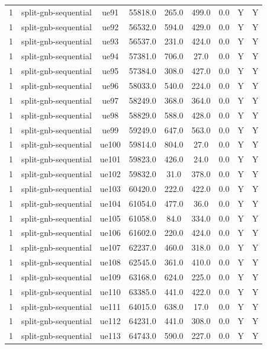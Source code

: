 \begin{table}[ht]
\begin{tabular}{|c|c|c|c|c|c|c|c|c|}
1 & split-gnb-sequential & ue91 & 55818.0 & 265.0 & 499.0 & 0.0 & Y & Y \\
1 & split-gnb-sequential & ue92 & 56532.0 & 594.0 & 429.0 & 0.0 & Y & Y \\
1 & split-gnb-sequential & ue93 & 56537.0 & 231.0 & 424.0 & 0.0 & Y & Y \\
1 & split-gnb-sequential & ue94 & 57381.0 & 706.0 & 27.0 & 0.0 & Y & Y \\
1 & split-gnb-sequential & ue95 & 57384.0 & 308.0 & 427.0 & 0.0 & Y & Y \\
1 & split-gnb-sequential & ue96 & 58033.0 & 540.0 & 224.0 & 0.0 & Y & Y \\
1 & split-gnb-sequential & ue97 & 58249.0 & 368.0 & 364.0 & 0.0 & Y & Y \\
1 & split-gnb-sequential & ue98 & 58829.0 & 588.0 & 428.0 & 0.0 & Y & Y \\
1 & split-gnb-sequential & ue99 & 59249.0 & 647.0 & 563.0 & 0.0 & Y & Y \\
1 & split-gnb-sequential & ue100 & 59814.0 & 804.0 & 27.0 & 0.0 & Y & Y \\
1 & split-gnb-sequential & ue101 & 59823.0 & 426.0 & 24.0 & 0.0 & Y & Y \\
1 & split-gnb-sequential & ue102 & 59832.0 & 31.0 & 378.0 & 0.0 & Y & Y \\
1 & split-gnb-sequential & ue103 & 60420.0 & 222.0 & 422.0 & 0.0 & Y & Y \\
1 & split-gnb-sequential & ue104 & 61054.0 & 477.0 & 36.0 & 0.0 & Y & Y \\
1 & split-gnb-sequential & ue105 & 61058.0 & 84.0 & 334.0 & 0.0 & Y & Y \\
1 & split-gnb-sequential & ue106 & 61602.0 & 220.0 & 424.0 & 0.0 & Y & Y \\
1 & split-gnb-sequential & ue107 & 62237.0 & 460.0 & 318.0 & 0.0 & Y & Y \\
1 & split-gnb-sequential & ue108 & 62545.0 & 361.0 & 410.0 & 0.0 & Y & Y \\
1 & split-gnb-sequential & ue109 & 63168.0 & 624.0 & 225.0 & 0.0 & Y & Y \\
1 & split-gnb-sequential & ue110 & 63385.0 & 441.0 & 422.0 & 0.0 & Y & Y \\
1 & split-gnb-sequential & ue111 & 64015.0 & 638.0 & 17.0 & 0.0 & Y & Y \\
1 & split-gnb-sequential & ue112 & 64231.0 & 441.0 & 308.0 & 0.0 & Y & Y \\
1 & split-gnb-sequential & ue113 & 64743.0 & 590.0 & 227.0 & 0.0 & Y & Y \\

\end{tabular}
\end{table}
